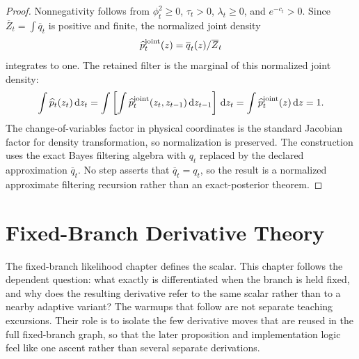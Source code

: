 \documentclass[11pt]{article}
\numberwithin{equation}{section}
\newcommand{\dd}{\,\mathrm d}
\begin{document}
\begin{proof}
Nonnegativity follows from
\(\phi_t^2\ge0\), \(\tau_t>0\), \(\lambda_t\ge0\), and \(e^{-c_t}>0\).  Since
\(\overline Z_t=\int\overline q_t\) is positive and finite, the normalized joint
density
\[
    \widehat p_t^{\rm joint}(z)
    =
    \overline q_t(z)/\overline Z_t
\]
integrates to one.  The retained filter is the marginal of this normalized
joint density:
\[
    \int \widehat p_t(z_t)\dd z_t
    =
    \int
    \left[
    \int \widehat p_t^{\rm joint}(z_t,z_{t-1})\dd z_{t-1}
    \right]\dd z_t
    =
    \int \widehat p_t^{\rm joint}(z)\dd z
    =
    1.
\]
The change-of-variables factor in physical coordinates is the standard
Jacobian factor for density transformation, so normalization is preserved.  The
construction uses the exact Bayes filtering algebra with \(q_t\) replaced by
the declared approximation \(\overline q_t\).  No step asserts that
\(\overline q_t=q_t\), so the result is a normalized approximate filtering
recursion rather than an exact-posterior theorem.
\end{proof}


\section{Fixed-Branch Derivative Theory}

The fixed-branch likelihood chapter defines the scalar.  This chapter follows the
dependent question: what exactly is differentiated when the branch is held fixed,
and why does the resulting derivative refer to the same scalar rather than to a
nearby adaptive variant?  The warmups that follow are not separate teaching
excursions.  Their role is to isolate the few derivative moves that are reused in
the full fixed-branch graph, so that the later proposition and implementation
logic feel like one ascent rather than several separate derivations.
\end{document}
